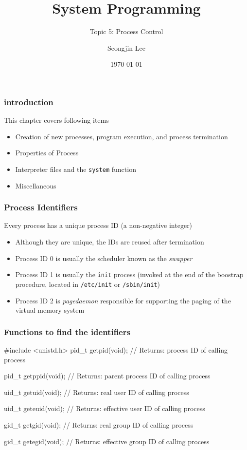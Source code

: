 \documentclass[newPxFont,sthlmFooter,nooffset]{beamer}
\title{System Programming}
\subtitle{Topic 5: Process Control}
\author[SJL]{Seongjin Lee}
\institute{\href{mailto:insight@gnu.ac.kr}{insight@gnu.ac.kr}\\\url{http://open.gnu.ac.kr}\\Systems Research Lab.\\Gyeongsang National University}
\date{\today}
\begin{document}
\frame[plain]{\titlepage}






\begin{frame}[t]
  \frametitle{introduction}
This chapter covers following items
  \begin{itemize}
  \item Creation of new processes, program execution, and process termination
  \item Properties of Process
  \item Interpreter files and the \texttt{system} function
  \item Miscellaneous
  \end{itemize}

\end{frame}


\begin{frame}[t]
  \frametitle{Process Identifiers}
Every process has a unique process ID (a non-negative integer)
\begin{itemize}
\item Although they are unique, the IDs are reused after termination
\item Process ID 0 is usually the scheduler known as the \textit{swapper}
\item Process ID 1 is usually the \texttt{init} process (invoked at the end of the boostrap procedure, located in \texttt{/etc/init} or \texttt{/sbin/init})
\item Process ID 2 is \textit{pagedaemon} responsible for supporting the paging of the virtual memory system
\end{itemize}
\end{frame}

\begin{frame}[containsverbatim,t]
  \frametitle{Functions to find the identifiers}
\begin{codedef}
#include <unistd.h>
pid_t getpid(void);
// Returns: process ID of calling process

pid_t getppid(void);
// Returns: parent process ID of calling process

uid_t getuid(void);
// Returns: real user ID of calling process

uid_t geteuid(void);
// Returns: effective user ID of calling process

gid_t getgid(void);
// Returns: real group ID of calling process

gid_t getegid(void);
// Returns: effective group ID of calling process
\end{codedef}
\end{frame}
\end{document}

